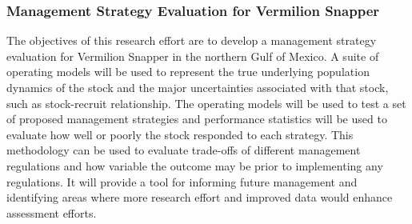 \documentclass[]{article}
\begin{document}
\hypertarget{management-strategy-evaluation-for-vermilion-snapper}{%
\subsubsection{Management Strategy Evaluation for Vermilion
Snapper}\label{management-strategy-evaluation-for-vermilion-snapper}}

The objectives of this research effort are to develop a management
strategy evaluation for Vermilion Snapper in the northern Gulf of
Mexico. A suite of operating models will be used to represent the true
underlying population dynamics of the stock and the major uncertainties
associated with that stock, such as stock-recruit relationship. The
operating models will be used to test a set of proposed management
strategies and performance statistics will be used to evaluate how well
or poorly the stock responded to each strategy. This methodology can be
used to evaluate trade-offs of different management regulations and how
variable the outcome may be prior to implementing any regulations. It
will provide a tool for informing future management and identifying
areas where more research effort and improved data would enhance
assessment efforts.
\end{document}
